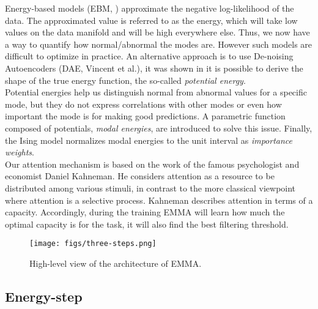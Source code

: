 \documentclass[12pt]{report}
\begin{document}
\indent Energy-based models (EBM, \cite{EBM}) approximate the negative log-likelihood of the data. The approximated value is referred to as the energy, which will take low values on the data manifold and will be high everywhere else. Thus, we now have a way to quantify how normal/abnormal the modes are. However such models are difficult to optimize in practice. An alternative approach is to use De-noising Autoencoders (DAE, Vincent et al.\cite{dae-vincent}), it was shown in\cite{potentialenergy} it is possible to derive the shape of the true energy function, the so-called \textit{potential energy}. \\

\indent Potential energies help us distinguish normal from abnormal values for a specific mode, but they do not express correlations with other modes or even how important the mode is for making good predictions. A parametric function composed of potentials, \textit{modal energies}, are introduced to solve this issue. Finally, the Ising model\cite{ising-model} normalizes modal energies to the unit interval as \textit{importance weights}.\\

\indent Our attention mechanism is based on the work of the famous psychologist and economist Daniel Kahneman. He considers attention as a resource to be distributed among various stimuli\cite{kahneman}, in contrast to the more classical viewpoint where attention is a selective process. Kahneman describes attention in terms of a capacity. Accordingly, during the training EMMA will learn how much the optimal capacity is for the task, it will also find the best filtering threshold.

\begin{figure}[!hbtp]
\centering
\texttt{[image: figs/three-steps.png]}
\caption{High-level view of the architecture of EMMA.}
\label{fig:three-steps}
\end{figure}


\subsection{Energy-step}
\end{document}
